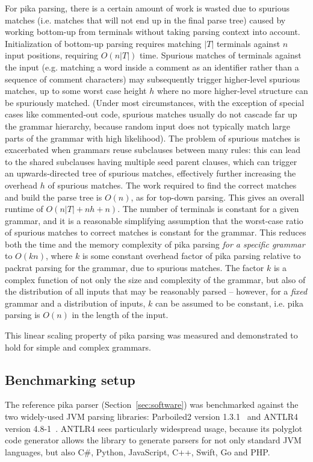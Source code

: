 \documentclass[manuscript,screen]{acmart}
\begin{document}
For pika parsing, there is a certain amount of work is wasted due to spurious matches (i.e. matches that will not end up in the final parse tree) caused by working bottom-up from terminals without taking parsing context into account. Initialization of bottom-up parsing requires matching $|T|$ terminals against $n$ input positions, requiring $O(n|T|)$ time. Spurious matches of terminals against the input (e.g. matching a word inside a comment as an identifier rather than a sequence of comment characters) may subsequently trigger higher-level spurious matches, up to some worst case height $h$ where no more higher-level structure can be spuriously matched. (Under most circumstances, with the exception of special cases like commented-out code, spurious matches usually do not cascade far up the grammar hierarchy, because random input does not typically match large parts of the grammar with high likelihood). The problem of spurious matches is exacerbated when grammars reuse subclauses between many rules: this can lead to the shared subclauses having multiple seed parent clauses, which can trigger an upwards-directed tree of spurious matches, effectively further increasing the overhead $h$ of spurious matches. The work required to find the correct matches and build the parse tree is $O(n)$, as for top-down parsing. This gives an overall runtime of $O(n|T| + nh + n)$. The number of terminals is constant for a given grammar, and it is a reasonable simplifying assumption that the worst-case ratio of spurious matches to correct matches is constant for the grammar. This reduces both the time and the memory complexity of pika parsing \emph{for a specific grammar} to $O(kn)$, where $k$ is some constant overhead factor of pika parsing relative to packrat parsing for the grammar, due to spurious matches. The factor $k$ is a complex function of not only the size and complexity of the grammar, but also of the distribution of all inputs that may be reasonably parsed -- however, for a \emph{fixed} grammar and a distribution of inputs, $k$ can be assumed to be constant, i.e. pika parsing is $O(n)$ in the length of the input.

This linear scaling property of pika parsing was measured and demonstrated to hold for simple and complex grammars.

\subsection{Benchmarking setup}

The reference pika parser (Section~\ref{sec:software}) was benchmarked against the two widely-used JVM parsing libraries: Parboiled2 version 1.3.1~\citep{parboiled2} and ANTLR4 version 4.8-1~\citep{antlr4}. ANTLR4 sees particularly widespread usage, because its polyglot code generator allows the library to generate parsers for not only standard JVM languages, but also C\#, Python, JavaScript, C++, Swift, Go and PHP.
\end{document}
